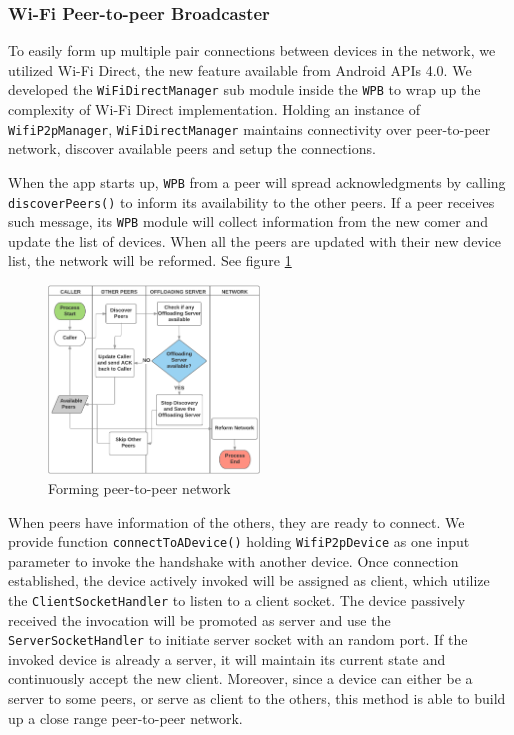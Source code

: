 \documentclass[conference]{IEEEtran}
\begin{document}
\subsubsection{Wi-Fi Peer-to-peer Broadcaster}
To easily form up multiple pair connections between devices in the network, we utilized Wi-Fi Direct, the new feature available from Android APIs 4.0. We developed the \texttt{WiFiDirectManager} sub module inside the \texttt{WPB} to wrap up the complexity of Wi-Fi Direct implementation. Holding an instance of \texttt{WifiP2pManager}, \texttt{WiFiDirectManager} maintains connectivity over peer-to-peer network, discover available peers and setup the connections. 

When the app starts up, \texttt{WPB} from a peer will spread acknowledgments by calling \texttt{discoverPeers()} to inform its availability to the other peers. If a peer receives such message, its \texttt{WPB} module will collect information from the new comer and update the list of devices. When all the peers are updated with their new device list, the network will be reformed. See figure \ref{fig:forming}

\begin{figure}[H]
\centerline {
\includegraphics[width=0.5\textwidth, natwidth=1127, natheight=615]{data/discoverPeers}
}
\caption{Forming peer-to-peer network}
\label{fig:forming}
\end{figure}

When peers have information of the others, they are ready to connect. We provide function \texttt{connectToADevice()} holding \texttt{WifiP2pDevice} as one input parameter to invoke the handshake with another device. Once connection established, the device actively invoked will be assigned as client, which utilize the \texttt{ClientSocketHandler} to listen to a client socket. The device passively received the invocation will be promoted as server and use the \texttt{ServerSocketHandler} to initiate server socket with an random port. If the invoked device is already a server, it will maintain its current state and continuously accept the new client. Moreover, since a device can either be a server to some peers, or serve as client to the others, this method is able to build up a close range peer-to-peer network.
\end{document}
